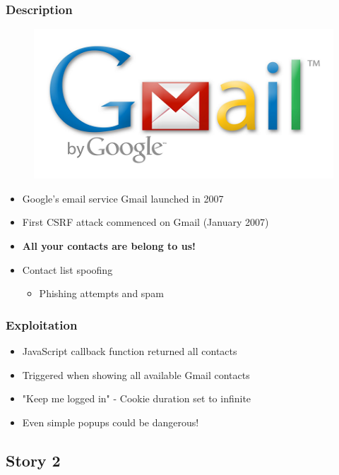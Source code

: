 \documentclass[svgnames]{beamer}
\begin{document}
\begin{frame}
  \frametitle{Description}
  
  \begin{figure}
    \includegraphics[width=.6\textwidth]{media/gmail_logo.png}
  \end{figure}	  
  
  \begin{itemize}
    \item Google's email service Gmail launched in 2007
    \pause
    \item First CSRF attack commenced on Gmail (January 2007)
    \pause
    \item \textbf{All your contacts are belong to us!}
    \item Contact list spoofing
    \begin{itemize}
      \item Phishing attempts and spam
    \end{itemize}
  \end{itemize}
\end{frame}

\begin{frame}
  \frametitle{Exploitation}
  \begin{itemize}
    \item JavaScript callback function returned all contacts
    \item Triggered when showing all available Gmail contacts
    \pause
    \item "Keep me logged in" - Cookie duration set to infinite
    \pause
    \item Even simple popups could be dangerous!
  \end{itemize}
\end{frame}

\subsection{Story 2}
\end{document}
